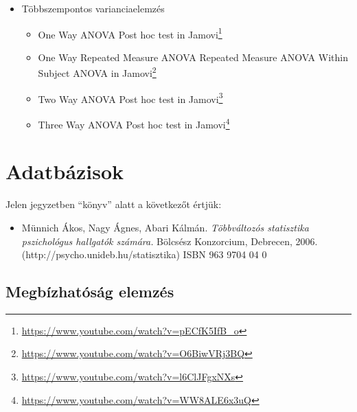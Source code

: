 \documentclass[
  letterpaper,
]{krantz}
\providecommand{\tightlist}{%
  \setlength{\itemsep}{0pt}\setlength{\parskip}{0pt}}\usepackage{longtable,booktabs,array}
\renewcommand{\href}[2]{#2\footnote{\url{#1}}}
\begin{document}
\begin{itemize}
  \begin{itemize}
  \tightlist
  \item
    \href{https://www.youtube.com/watch?v=ijUMKMC4f9I}{Flat and
    Hierarchical Clustering \textbar{} The Dendrogram Explained}
  \item
    \href{https://www.youtube.com/watch?v=YIGtalP1mv0}{K Means
    Clustering: Pros and Cons of K Means Clustering}
  \item
    \href{https://www.youtube.com/watch?v=TnFfAQpq0o4}{Hierarchical
    Cluster analysis in Jamovi}
  \item
    \href{https://www.youtube.com/watch?v=wW7TNlam77A}{K Means Cluster
    analysis in Jamovi}
  \end{itemize}
\item
  Többszempontos varianciaelemzés

  \begin{itemize}
  \tightlist
  \item
    \href{https://www.youtube.com/watch?v=pECfK5IfB_o}{One Way ANOVA
    Post hoc test in Jamovi}
  \item
    \href{https://www.youtube.com/watch?v=O6BiwVRj3BQ}{One Way Repeated
    Measure ANOVA Repeated Measure ANOVA Within Subject ANOVA in Jamovi}
  \item
    \href{https://www.youtube.com/watch?v=l6ClJFgxNXs}{Two Way ANOVA
    Post hoc test in Jamovi}
  \item
    \href{https://www.youtube.com/watch?v=WW8ALE6x3uQ}{Three Way ANOVA
    Post hoc test in Jamovi}
  \end{itemize}
\end{itemize}

\hypertarget{sec-adatbazisok}{%
\chapter{Adatbázisok}\label{sec-adatbazisok}}

Jelen jegyzetben ``könyv'' alatt a következőt értjük:

\begin{itemize}
\tightlist
\item
  Münnich Ákos, Nagy Ágnes, Abari Kálmán. \emph{Többváltozós statisztika
  pszichológus hallgatók számára.} Bölcsész Konzorcium, Debrecen, 2006.
  (http://psycho.unideb.hu/statisztika) ISBN 963 9704 04 0
\end{itemize}

\hypertarget{megbuxedzhatuxf3suxe1g-elemzuxe9s}{%
\section{Megbízhatóság
elemzés}\label{megbuxedzhatuxf3suxe1g-elemzuxe9s}}
\end{document}
